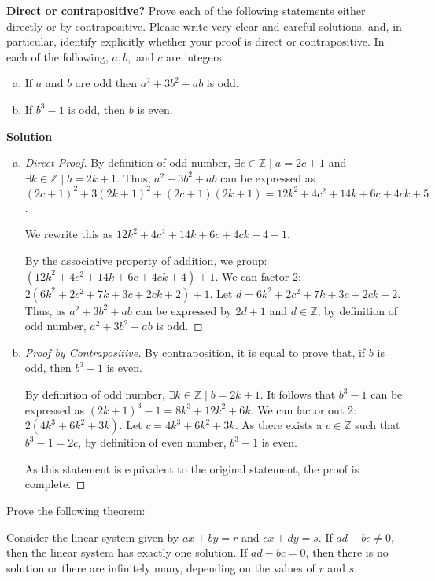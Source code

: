 \documentclass[11pt]{scrartcl}
\theoremstyle{dotlessP}
\theoremstyle{dotlessN}
\newcommand{\ints}{\mathbb{Z}}
\begin{document}
\begin{ques}
	\textbf{Direct or contrapositive?} Prove each of the following statements either directly or by contrapositive. Please write very clear and careful solutions, and, in particular, identify explicitly whether your proof is direct or contrapositive. In each of the following, $a,b,$ and  $c$ are integers.
	\begin{enumerate}[(a)]
		\item If $a$ and $b$ are odd then $a^2 + 3b^2 + ab$ is odd.
		\item If $b^3 -1$ is odd, then $b$ is even.
	\end{enumerate} 
\end{ques}
\textbf{Solution}
	\begin{enumerate}[(a)]
		\item 
			\begin{proof}
				[Direct Proof]
				By definition of odd number, $\exists c \in \ints \mid a = 2c + 1$ and $\exists k \in \ints \mid b = 2k + 1$. Thus, $a^2 + 3b^2 + ab$ can be expressed as $(2c+1)^2 + 3(2k+1)^2 + (2c+1)(2k+1) = 12k^2 + 4c^2 + 14k + 6c + 4ck + 5$. 

				We rewrite this as $12k^2 + 4c^2 + 14k + 6c + 4ck + 4 + 1$. 

				By the associative property of addition, we group: $(12k^2 + 4c^2 + 14k + 6c + 4ck + 4) + 1$. We can factor 2: $2(6k^2 + 2c^2 + 7k + 3c + 2ck + 2) + 1$. Let  $d = 6k^2 + 2c^2 + 7k + 3c + 2ck + 2$. Thus, as $a^2 + 3b^2 + ab$ can be expressed by $2d+1$ and $d \in \ints$, by definition of odd number, $a^2 + 3b^2 + ab$ is odd.
			\end{proof}
		\item 
		\begin{proof}
			[Proof by Contrapositive]
			By contraposition, it is equal to prove that, if $b$ is odd, then $b^3 -1 $ is even.

			By definition of odd number, $\exists k \in \ints \mid b = 2k + 1$.  It follows that $b^3 -1$ can be expressed as $(2k+1)^3 - 1 = 8k^3 + 12k^2 + 6k$. We can factor out 2: $2(4k^3 + 6k^2 + 3k)$. Let $c = 4k^3 + 6k^2 + 3k$. As there exists a $c \in \ints$ such that $b^3 -1 = 2c$, by definition of even number, $b^3 - 1$ is even.

			As this statement is equivalent to the original statement, the proof is complete.
		\end{proof}
	\end{enumerate}
\begin{ques}
	Prove the following theorem:
	\begin{theorem*}
		Consider the linear system given by $ax+by = r$ and $cx+dy=s$. If $ad-bc \neq 0$, then the linear system has exactly one solution. If $ad-bc=0$, then there is no solution or there are infinitely many, depending on the values of $r$ and $s$.
	\end{theorem*}
\end{ques}
\end{document}
